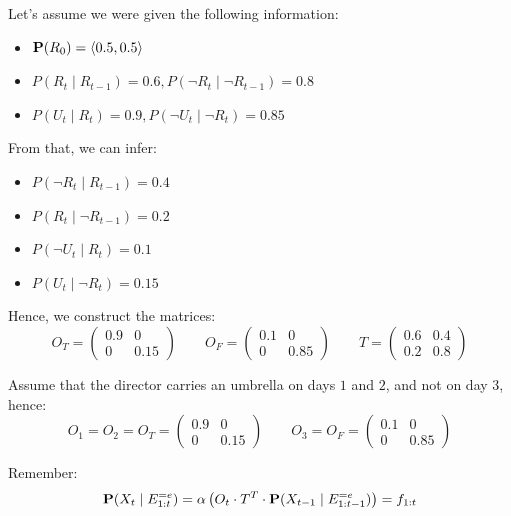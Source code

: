 
Let's assume we were given the following information:
\begin{itemize}
  \item $\textbf{P}(R_0) = \left\langle 0.5, 0.5 \right\rangle$
  \item $P(R_{t} \mid R_{t-1}) = 0.6, P(\neg R_{t} \mid \neg R_{t-1}) = 0.8$
  \item $P(U_{t} \mid R_{t}) = 0.9, P(\neg U_{t} \mid \neg R_{t}) = 0.85$
\end{itemize}

From that, we can infer: 
\begin{itemize}
  \item $P(\neg R_{t} \mid R_{t-1}) = 0.4$
  \item $P(R_{t} \mid \neg R_{t-1}) = 0.2$
  \item $P(\neg U_{t} \mid R_{t}) = 0.1$
  \item $P(U_{t} \mid \neg R_{t}) = 0.15$
\end{itemize}

Hence, we construct the matrices:
\[
O_T = \begin{pmatrix}
0.9 & 0 \\
0 & 0.15
\end{pmatrix}
\qquad
O_F = \begin{pmatrix}
0.1 & 0 \\
0 & 0.85
\end{pmatrix}
\qquad
T = \begin{pmatrix}
0.6 & 0.4 \\
0.2 & 0.8
\end{pmatrix}
\]

Assume that the director carries an umbrella on days $1$ and $2$, and not on day $3$, hence:
\[
O_1 = O_2 = O_T = \begin{pmatrix}
0.9 & 0 \\
0 & 0.15
\end{pmatrix}
\qquad
O_3 = O_F = \begin{pmatrix}
0.1 & 0 \\
0 & 0.85
\end{pmatrix}
\]

Remember:
\[
\textbf{P}(X_t \mid E_{1:t}^{=e}) = 
\alpha \left(
O_t \cdot T^T \cdot \textbf{P}(X_{t-1} \mid E_{1:t-1}^{=e})
\right) = f_{1:t}
\]


